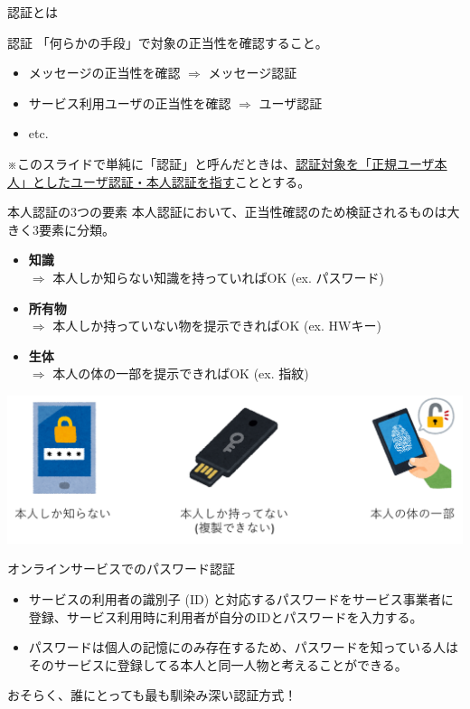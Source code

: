 \documentclass[12pt,dvipdfmx,uplatex]{beamer}
\begin{document}
\begin{frame}{認証とは}
\begin{block}{認証}
 「何らかの手段」で\alert{対象の正当性を確認する}こと。
\end{block}
\begin{itemize}
 \item メッセージの正当性を確認 $\Rightarrow$ メッセージ認証
 \item サービス利用ユーザの正当性を確認 $\Rightarrow$ ユーザ認証
 \item etc.
\end{itemize}

\vspace{2ex}

※このスライドで単純に「認証」と呼んだときは、\ul{認証対象を「正規ユーザ本人」としたユーザ認証・本人認証を指す}こととする。
\end{frame}

\begin{frame}{本人認証の3つの要素}
本人認証において、正当性確認のため検証されるものは大きく3要素に分類。
\begin{itemize}
 \item \textbf{知識}\\
$\Rightarrow$ 本人しか知らない知識を持っていればOK (ex. パスワード)
 \item \textbf{所有物}\\
$\Rightarrow$ 本人しか持っていない物を提示できればOK (ex. HWキー)
 \item \textbf{生体}\\
$\Rightarrow$ 本人の体の一部を提示できればOK (ex. 指紋)
\end{itemize}
\begin{center}
\includegraphics[width=0.7\linewidth]{Figs/auth-three-elements.pdf}
\end{center}

\end{frame}

\begin{frame}{オンラインサービスでのパスワード認証}
\begin{itemize}
\item サービスの利用者の識別子 (ID) と対応するパスワードをサービス事業者に登録、サービス利用時に利用者が自分のIDとパスワードを入力する。
\item パスワードは個人の記憶にのみ存在するため、\alert{パスワードを知っている人はそのサービスに登録してる本人と同一人物}と考えることができる。
\end{itemize}

\begin{center}
おそらく、誰にとっても最も馴染み深い認証方式！ 
\end{center}

\end{frame}
\end{document}
